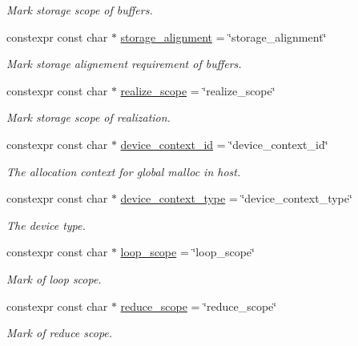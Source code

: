 \begin{DoxyCompactItemize}
\begin{DoxyCompactList}\small\item\em Mark storage scope of buffers. \end{DoxyCompactList}\item 
constexpr const char $\ast$ \hyperlink{namespacetvm_1_1tir_1_1attr_af27d464f2065dc5f77408df7b94d4bb6}{storage\+\_\+alignment} = \char`\"{}storage\+\_\+alignment\char`\"{}
\begin{DoxyCompactList}\small\item\em Mark storage alignement requirement of buffers. \end{DoxyCompactList}\item 
constexpr const char $\ast$ \hyperlink{namespacetvm_1_1tir_1_1attr_acf70bbdafa7344811d336422bf95cdc5}{realize\+\_\+scope} = \char`\"{}realize\+\_\+scope\char`\"{}
\begin{DoxyCompactList}\small\item\em Mark storage scope of realization. \end{DoxyCompactList}\item 
constexpr const char $\ast$ \hyperlink{namespacetvm_1_1tir_1_1attr_a5f3aac4e433fcd6d93f8982540960263}{device\+\_\+context\+\_\+id} = \char`\"{}device\+\_\+context\+\_\+id\char`\"{}
\begin{DoxyCompactList}\small\item\em The allocation context for global malloc in host. \end{DoxyCompactList}\item 
constexpr const char $\ast$ \hyperlink{namespacetvm_1_1tir_1_1attr_a9e64432b8b1b9323c5ad18957ba88b23}{device\+\_\+context\+\_\+type} = \char`\"{}device\+\_\+context\+\_\+type\char`\"{}
\begin{DoxyCompactList}\small\item\em The device type. \end{DoxyCompactList}\item 
constexpr const char $\ast$ \hyperlink{namespacetvm_1_1tir_1_1attr_a9125ab905a93924ee79269aa808ed517}{loop\+\_\+scope} = \char`\"{}loop\+\_\+scope\char`\"{}
\begin{DoxyCompactList}\small\item\em Mark of loop scope. \end{DoxyCompactList}\item 
constexpr const char $\ast$ \hyperlink{namespacetvm_1_1tir_1_1attr_a50fc9633b9cfbcefa2393dbb2ece1846}{reduce\+\_\+scope} = \char`\"{}reduce\+\_\+scope\char`\"{}
\begin{DoxyCompactList}\small\item\em Mark of reduce scope. \end{DoxyCompactList}\item 

\end{DoxyCompactItemize}
